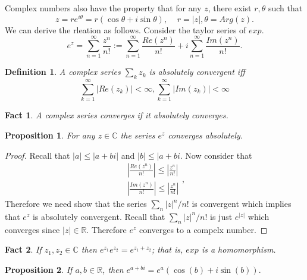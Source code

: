 \documentclass[letter]{article}
\newtheorem{fact}{Fact}
\newtheorem{definition}{Definition}
\newtheorem{proposition}{Proposition}
\begin{document}
	Complex numbers also have the property that for any $z$, there exist $r, \theta$ such that
	\begin{equation*}
		z = re^{i\theta} = r(\cos \theta + i\sin \theta), \;\;\;\; r = |z|, \theta = Arg(z).
	\end{equation*}
	We can derive the rleation as follows. Consider the taylor series of $exp$.
	\begin{equation*}
		e^{z}= \sum_{n=1}^\infty \frac{z^n}{n!} := \sum_{n=1}^\infty \frac{Re(z^n)}{n!} + i\sum_{n=1}^\infty \frac{Im(z^n)}{n!}.
	\end{equation*}
	\begin{definition}
		A complex series $\sum_k z_k$ is absolutely convergent iff
		\begin{equation*}
			\sum_{k=1}^\infty |Re(z_k)| < \infty, \sum_{k=1}^\infty |Im(z_k)| < \infty
		\end{equation*}
	\end{definition}
	\begin{fact}
		A complex series converges if it absolutely converges.
	\end{fact}
	\begin{proposition}
		For any $z \in \mathbb{C}$ the series $e^z$ converges absolutely.
	\end{proposition}
	\begin{proof}
		Recall that $|a| \leq |a + bi|$ and $|b| \leq |a + bi$. Now consider that
		\begin{equation*}
			\begin{aligned}
				\left|\frac{Re(z^n)}{n!}\right| \leq \left|\frac{z^n}{n!}\right| \\
				\left|\frac{Im(z^n)}{n!}\right| \leq \left|\frac{z^n}{n!}\right|
			\end{aligned},
		\end{equation*}
		Therefore we need show that the series $\sum_n |z|^n/n!$ is convergent which implies that $e^z$ is absolutely convergent.
		Recall that $\sum_n |z|^n/n!$ is just $e^|z|$ which converges since $|z| \in \mathbb{R}.$ Therefore
		$e^z$ converges to a compelx number.
	\end{proof}
	\begin{fact}
		If $z_1, z_2 \in \mathbb{C}$ then $e^{z_1}e^{z_2}=e^{z_1 + z_2}$; that is, $exp$ is a homomorphism.
	\end{fact}
	\begin{proposition}
		If $a, b \in \mathbb{R}$, then $e^{a + bi} = e^a(\cos(b) + i\sin(b)).$
	\end{proposition}
\end{document}
